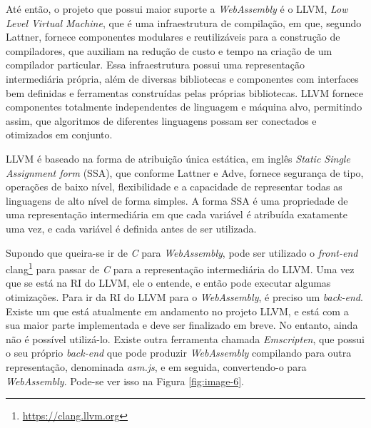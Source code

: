 \begin{figure}[h!]
    \centering
\end{figure}

Até então, o projeto que possui maior suporte a \textit{WebAssembly} é o LLVM,
\textit{Low Level Virtual Machine}, que é uma infraestrutura de compilação, em que,
segundo Lattner, fornece componentes modulares e reutilizáveis para a construção de
compiladores, que auxiliam na redução de custo e tempo na criação de um compilador
particular. Essa infraestrutura possui uma representação intermediária própria, além
de diversas bibliotecas e componentes com interfaces bem definidas e ferramentas
construídas pelas próprias bibliotecas. LLVM fornece componentes totalmente independentes
de linguagem e máquina alvo, permitindo assim, que algoritmos de diferentes linguagens
possam ser conectados e otimizados em conjunto. \cite{llvm-intro}

LLVM é baseado na forma de atribuição única estática, em inglês
\textit{Static Single Assignment form} (SSA), que conforme Lattner e Adve, fornece
segurança de tipo, operações de baixo nível, flexibilidade e a capacidade de representar
todas as linguagens de alto nível de forma simples. A forma SSA é uma propriedade de uma
representação intermediária em que cada variável é atribuída exatamente uma vez, e cada
variável é definida antes de ser utilizada. \cite{llvm-langref}

Supondo que queira-se ir de \textit{C} para \textit{WebAssembly}, pode ser utilizado o
\textit{front-end} clang\footnote[1]{\url{https://clang.llvm.org}} para passar de
\textit{C} para a representação intermediária do LLVM. Uma vez que se está na RI do LLVM,
ele o entende, e então pode executar algumas otimizações. Para ir da RI do LLVM para o
\textit{WebAssembly}, é preciso um \textit{back-end}. Existe um que está atualmente em
andamento no projeto LLVM, e está com a sua maior parte implementada e deve ser finalizado
em breve. No entanto, ainda não é possível utilizá-lo. Existe outra ferramenta chamada
\textit{Emscripten}, que possui o seu próprio \textit{back-end} que pode produzir
\textit{WebAssembly} compilando para outra representação, denominada \textit{asm.js}, e em
seguida, convertendo-o para \textit{WebAssembly}. Pode-se ver isso na Figura
\ref{fig:image-6}.

